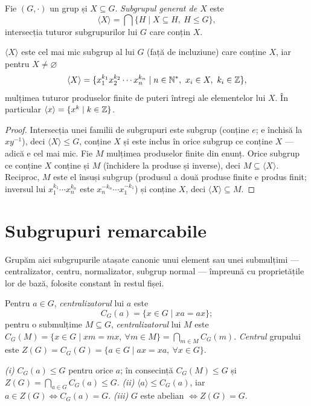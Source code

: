 \begin{definitie}
Fie $(G,\cdot)$ un grup și $X\subseteq G$. \emph{Subgrupul generat de $X$} este
\[
\langle X\rangle=\bigcap\{H\mid X\subseteq H,\ H\le G\},
\]
intersecția tuturor subgrupurilor lui $G$ care conțin $X$.
\end{definitie}

\begin{propozitie}
$\langle X\rangle$ este cel mai mic subgrup al lui $G$ (față de incluziune) care conține $X$, iar pentru $X\neq\varnothing$
\[
\langle X\rangle=\{x_1^{k_1}x_2^{k_2}\cdots x_n^{k_n}\mid n\in\mathbb{N}^*,\ x_i\in X,\ k_i\in\mathbb{Z}\},
\]
mulțimea tuturor produselor finite de puteri întregi ale elementelor lui $X$. În particular $\langle x\rangle=\{x^k\mid k\in\mathbb{Z}\}$.
\end{propozitie}
\begin{proof}
Intersecția unei familii de subgrupuri este subgrup (conține $e$; e închisă la $xy^{-1}$), deci $\langle X\rangle\le G$, conține $X$ și este inclus în orice subgrup ce conține $X$ --- adică e cel mai mic. Fie $M$ mulțimea produselor finite din enunț. Orice subgrup ce conține $X$ conține și $M$ (închidere la produse și inverse), deci $M\subseteq\langle X\rangle$. Reciproc, $M$ este el însuși subgrup (produsul a două produse finite e produs finit; inversul lui $x_1^{k_1}\cdots x_n^{k_n}$ este $x_n^{-k_n}\cdots x_1^{-k_1}$) și conține $X$, deci $\langle X\rangle\subseteq M$.
\end{proof}

\section{Subgrupuri remarcabile}

Grupăm aici subgrupurile atașate canonic unui element sau unei submulțimi --- centralizator, centru, normalizator, subgrup normal --- împreună cu proprietățile lor de bază, folosite constant în restul fișei.

\begin{definitie}
Pentru $a\in G$, \emph{centralizatorul} lui $a$ este
\[
C_G(a)=\{x\in G\mid xa=ax\};
\]
pentru o submulțime $M\subseteq G$, \emph{centralizatorul} lui $M$ este
$C_G(M)=\{x\in G\mid xm=mx,\ \forall m\in M\}=\bigcap_{m\in M}C_G(m)$.
\emph{Centrul} grupului este $Z(G)=C_G(G)=\{a\in G\mid ax=xa,\ \forall x\in G\}$.
\end{definitie}

\begin{propozitie}\label{prop:centralizator}
\emph{(i)} $C_G(a)\le G$ pentru orice $a$; în consecință $C_G(M)\le G$ și $Z(G)=\bigcap_{a\in G}C_G(a)\le G$.
\emph{(ii)} $\langle a\rangle\le C_G(a)$, iar $a\in Z(G)\iff C_G(a)=G$.
\emph{(iii)} $G$ este abelian $\iff Z(G)=G$.
\end{propozitie}


